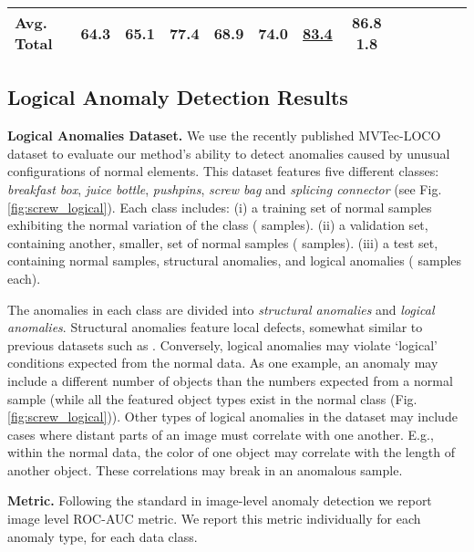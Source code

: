 \documentclass{article}
\begin{document}
\begin{table*}[t]
\begin{tabular}{lcccccccccccc}
Avg. Total		&	64.3	&	65.1	&	77.4	&	68.9	&	74.0 & \underline{83.4}	&	\textbf{86.8}  \textbf{1.8}	\\
 
\bottomrule
\end{tabular}
\label{tab:loco_anomalies}
\end{table*}




\subsection{Logical Anomaly Detection Results}

\textbf{Logical Anomalies Dataset.} We use the recently published MVTec-LOCO dataset \cite{bergmann2022beyond} to evaluate our method's ability to detect anomalies caused by unusual configurations of normal elements. This dataset features five different classes: \textit{breakfast box}, \textit{juice bottle}, \textit{pushpins}, \textit{screw bag} and \textit{splicing connector} (see Fig.\ref{fig:screw_logical}).  Each class includes: (i) a training set of normal samples exhibiting the normal variation of the class ( samples). (ii) a validation set, containing another, smaller, set of normal samples ( samples). (iii) a test set, containing normal samples, structural anomalies, and logical anomalies ( samples each). 

The anomalies in each class are divided into \textit{structural anomalies} and \textit{logical anomalies}. Structural anomalies feature local defects, somewhat similar to previous datasets such as \cite{bergmann2019mvtec}. Conversely, logical anomalies may violate `logical' conditions expected from the normal data. As one example, an anomaly may include a different number of objects than the numbers expected from a normal sample (while all the featured object types exist in the normal class (Fig.\ref{fig:screw_logical})). Other types of logical anomalies in the dataset may include cases where distant parts of an image must correlate with one another. E.g., within the normal data, the color of one object may correlate with the length of another object. These correlations may break in an anomalous sample. 

\textbf{Metric.} Following the standard in image-level anomaly detection we report image level ROC-AUC metric. We report this metric individually for each anomaly type, for each data class.
\end{document}
